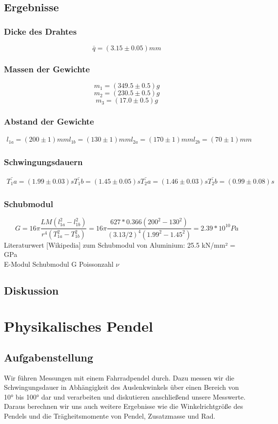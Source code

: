 \documentclass{article}
\begin{document}
\subsection{Ergebnisse}
\subsubsection*{Dicke des Drahtes}
$$\bar{q}=(3.15 \pm 0.05)mm$$ 
\subsubsection*{Massen der Gewichte}
$$m_1=(349.5 \pm 0.5)g$$
$$m_2=(230.5 \pm 0.5)g$$
$$m_3=(17.0 \pm 0.5)g$$
\subsubsection*{Abstand der Gewichte}
\begin{gather*}
l_{1a}=(200 \pm 1)mm
l_{1b}=(130 \pm 1)mm
l_{2a}=(170 \pm 1)mm
l_{2b}=(70 \pm 1)mm
\end{gather*}
\subsubsection*{Schwingungsdauern}
\begin{gather*}
\bar{T_1a}=(1.99 \pm 0.03)s
\bar{T_1b}=(1.45 \pm 0.05)s
\bar{T_2a}=(1.46 \pm 0.03)s
\bar{T_2b}=(0.99 \pm 0.08)s
\end{gather*}
\subsubsection*{Schubmodul}
\begin{equation}
\label{Gfinal}
G=16\pi\frac{LM(l_{1a}^2-l_{1b}^2)}{r^4(T_{1a}^2-T_{1b}^2)}=16\pi\frac{627*0.366(200^2-130^2)}{(3.13/2)^4(1.99^2-1.45^2)}=2.39*10^{10} Pa
\end{equation} 
Literaturwert [Wikipedia] zum Schubmodul von Aluminium: 25.5 kN/mm² = GPa\\
E-Modul
Schubmodul G
Poissonzahl $\nu$
\subsection{Diskussion}
\section{Physikalisches Pendel}
\subsection{Aufgabenstellung}
Wir führen Messungen mit einem Fahrradpendel durch. Dazu messen wir die Schwingungsdauer in Abhängigkeit des Auslenkwinkels über einen Bereich von 10° bis 100° dar und verarbeiten und diskutieren anschließend unsere Messwerte. 
Daraus berechnen wir uns auch weitere Ergebnisse wie die Winkelrichtgröße des Pendels und die Trägheitsmomente von Pendel, Zusatzmasse und Rad. 
\end{document}
